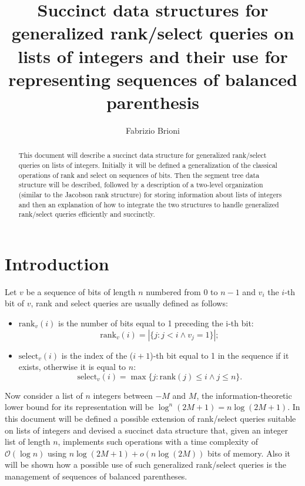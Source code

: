 \documentclass{article}
\title{Succinct data structures for generalized rank/select queries on lists of integers and their use for representing sequences of balanced parenthesis}
\author{Fabrizio Brioni}
\begin{document}
\maketitle

\begin{abstract}
This document will describe a succinct data structure for generalized rank/select queries on lists of integers. Initially it will be defined a generalization of the classical operations of rank and select on sequences of bits. Then the segment tree data structure will be described, followed by a description of a two-level organization (similar to the Jacobson rank structure) for storing information about lists of integers and then an explanation of how to integrate the two structures to handle generalized rank/select queries efficiently and succinctly.
\end{abstract}

\section{Introduction}
Let $v$ be a sequence of bits of length $n$ numbered from $0$ to $n-1$ and $v_i$ the $i$-th bit of $v$, rank and select queries are usually defined as follows:
    \begin{itemize}
        \item $\text{rank}_v(i)$ is the number of bits equal to 1 preceding the i-th bit:
            $$\text{rank}_v(i)=|\{j : j<i \land v_j=1\}|;$$
        \item $\text{select}_v(i)$ is the index of the ($i+1$)-th bit equal to 1 in the sequence if it exists, otherwise it is equal to $n$:
            $$\text{select}_v(i)=\max\{j : \text{rank}(j) \leq i \land j \leq n\}.$$ 
    \end{itemize}
Now consider a list of $n$ integers between $-M$ and $M$, the information-theoretic lower bound for its representation will be $\log^n{(2M+1)}=n\log{(2M+1)}$.
In this document will be defined a possible extension of rank/select queries suitable on lists of integers and devised a succinct data structure that, given an integer list of length $n$, implements such operations with a time complexity of $\mathcal{O}(\log{n})$ using $n\log{(2M+1)} + o(n\log{(2M)})$ bits of memory. Also it will be shown how a possible use of such generalized rank/select queries is the management of sequences of balanced parentheses.
\end{document}
